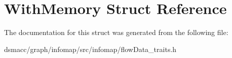 \hypertarget{structWithMemory}{}\section{With\+Memory Struct Reference}
\label{structWithMemory}


The documentation for this struct was generated from the following file\+:\begin{DoxyCompactItemize}
\item 
dsmacc/graph/infomap/src/infomap/flow\+Data\+\_\+traits.\+h\end{DoxyCompactItemize}
